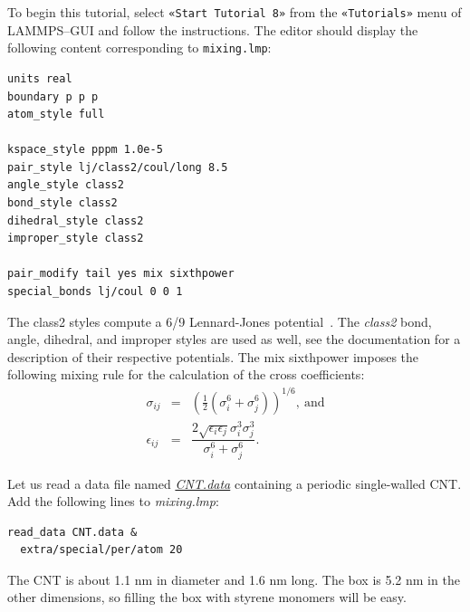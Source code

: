 \documentclass[9pt,tutorial]{livecoms}
\newcommand{\lmpcmd}[1]{\hspace{0pt}\colorbox{listing}{\textcolor{command}{\small{#1}}}\hspace{0pt}} %
\newcommand{\flecmd}[1]{\textcolor{command}{\texttt{#1}}} %
\newcommand{\guicmd}[1]{\textcolor{command}{\texttt{«#1»}}} %
\newcommand{\filepath}{https://raw.githubusercontent.com/lammpstutorials/lammpstutorials-article/main/files/}
\begin{document}
To begin this tutorial, select \guicmd{Start Tutorial 8} from the
\guicmd{Tutorials} menu of LAMMPS--GUI and follow the instructions.
The editor should display the following content corresponding to \flecmd{mixing.lmp}:
\begin{lstlisting}
units real
boundary p p p
atom_style full

kspace_style pppm 1.0e-5
pair_style lj/class2/coul/long 8.5
angle_style class2
bond_style class2
dihedral_style class2
improper_style class2

pair_modify tail yes mix sixthpower
special_bonds lj/coul 0 0 1
\end{lstlisting}
The \lmpcmd{class2} styles compute a 6/9 Lennard-Jones potential~\cite{sun1998compass}.
The \textit{class2} bond, angle, dihedral, and improper styles are used as
well, see the documentation for a description of their respective potentials.
The \lmpcmd{mix sixthpower} imposes the following mixing rule for the calculation
of the cross coefficients: 
\begin{eqnarray}
\nonumber
\sigma_{ij} & = & \left( \frac{1}{2} (\sigma^6_i+\sigma_j^6) \right)^{1/6}, ~ \text{and} \\
\nonumber
\epsilon_{ij} & = & \dfrac{2 \sqrt{\epsilon_i \epsilon_j} \sigma^3_i \sigma^3_j}{\sigma^6_i+\sigma_j^6}.
\end{eqnarray}

Let us read a data file named \href{\filepath tutorial8/CNT.data}{\textit{CNT.data}}
containing a periodic single-walled CNT.  Add the following lines to \textit{mixing.lmp}:
{\normalsize
\begin{verbatim}
read_data CNT.data &
  extra/special/per/atom 20
\end{verbatim}
}
The CNT is about 1.1 nm in diameter and 1.6 nm long.
The box is 5.2 nm in the other dimensions, so filling the box with
styrene monomers will be easy.
\end{document}
